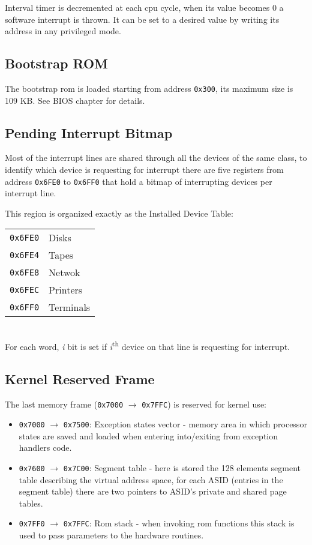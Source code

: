 Interval timer is decremented at each cpu cycle, when its value becomes 0 a software interrupt is thrown. It can be set to a desired value by writing its address in any privileged mode.

\subsection{Bootstrap ROM}
The bootstrap rom is loaded starting from address \texttt{0x300}, its maximum size is 109 KB.
See BIOS chapter for details.

\subsection{Pending Interrupt Bitmap}
Most of the interrupt lines are shared through all the devices of the same class, to identify which device is requesting for interrupt there are five registers from address \texttt{0x6FE0} to \texttt{0x6FF0} that hold a bitmap of interrupting devices per interrupt line.

This region is organized exactly as the Installed Device Table:
\\

\begin{tabular}{r|l}
\texttt{0x6FE0} & Disks \\
\texttt{0x6FE4} & Tapes \\
\texttt{0x6FE8} & Netwok \\
\texttt{0x6FEC} & Printers \\
\texttt{0x6FF0} & Terminals \\
\end{tabular}
\\

For each word, \emph{i} bit is set if \emph{i}\textsuperscript{th} device on that line is requesting for interrupt.

\subsection{Kernel Reserved Frame}
The last memory frame (\texttt{0x7000} $\rightarrow$ \texttt{0x7FFC}) is reserved for kernel use:
\begin{itemize}
\item \texttt{0x7000} $\rightarrow$ \texttt{0x7500}: Exception states vector - memory area in which processor states are saved and loaded when entering into/exiting from exception handlers code.
\item \texttt{0x7600} $\rightarrow$ \texttt{0x7C00}: Segment table - here is stored the 128 elements segment table describing the virtual address space, for each ASID (entries in the segment table) there are two pointers to ASID's private and shared page tables.
\item \texttt{0x7FF0} $\rightarrow$ \texttt{0x7FFC}: Rom stack - when invoking rom functions this stack is used to pass parameters to the hardware routines.
\end{itemize}

